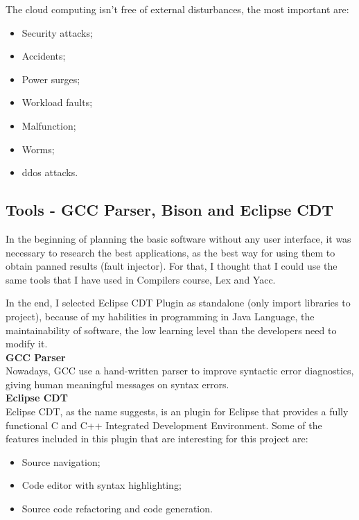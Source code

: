 The cloud computing isn't free of external disturbances\cite{wolter2012resilience}, the most important are:
\begin{itemize}
 	\item Security attacks;
 	\item Accidents;
 	\item Power surges;
 	\item Workload faults;
 	\item Malfunction;
 	\item Worms;
 	\item \ac{ddos} attacks.
 \end{itemize}

\clearpage
\subsection{Tools - GCC Parser, Bison and Eclipse CDT}

In the beginning of planning the basic software without any user interface, it was necessary to research the best applications, as the best way for using them to obtain panned results (fault injector).
For that, I thought that I could use the same tools that I have used in Compilers course, Lex and Yacc.


In the end, I selected Eclipse CDT Plugin as standalone (only import libraries to project), because of my habilities in programming in Java Language, the maintainability of software, the low learning level than the developers need to modify it.\\

\textbf{GCC Parser}\\

Nowadays, GCC use a hand-written parser to improve syntactic error diagnostics, giving human meaningful messages on syntax errors.\\

\textbf{Eclipse CDT}\\

Eclipse CDT, as the name suggests, is an plugin for Eclipse that provides a fully functional C and C++ Integrated Development Environment.
Some of the features included in this plugin that are interesting for this project are:
\begin{itemize}
	\item Source navigation;
	\item Code editor with syntax highlighting;
	\item Source code refactoring and code generation.
\end{itemize}

